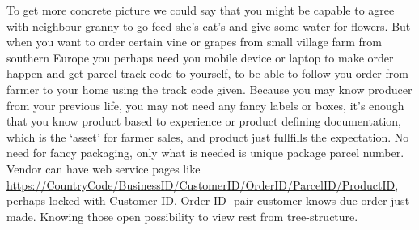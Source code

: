To get more concrete picture we could say that you might be capable to agree
with neighbour granny to go feed she's cat's and give some water for flowers.
But when you want to order certain vine or grapes from small village farm from
southern Europe you perhaps need you mobile device or laptop to make order
happen and get parcel track code to yourself, to be able to follow you order
from farmer to your home using the track code given. Because you may know
producer from your previous life, you may not need any fancy labels or boxes,
it's enough that you know product based to experience or product defining
documentation, which is the `asset' for farmer sales, and product just
fullfills the expectation. No need for fancy packaging, only what is needed
is unique package parcel number. Vendor can have web service pages like
\url{https://CountryCode/BusinessID/CustomerID/OrderID/ParcelID/ProductID},
perhaps locked with Customer ID, Order ID -pair customer knows due order
just made. Knowing those open possibility to view rest from tree-structure.

